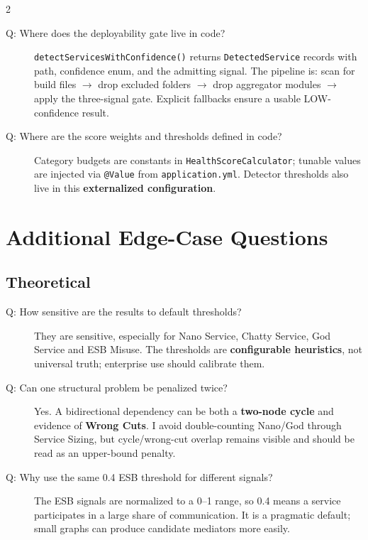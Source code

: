 \documentclass[10pt,a4paper]{article}
\begin{document}
\begin{multicols}{2}
\begin{description}
    \item[Q: Where does the deployability gate live in code?]
    \texttt{detectServicesWithConfidence()} returns \texttt{DetectedService} records with path, confidence enum, and the admitting signal. The pipeline is: scan for build files \(\rightarrow\) drop excluded folders \(\rightarrow\) drop aggregator modules \(\rightarrow\) apply the three-signal gate. Explicit fallbacks ensure a usable LOW-confidence result.

    \item[Q: Where are the score weights and thresholds defined in code?]
    Category budgets are constants in \texttt{HealthScoreCalculator}; tunable values are injected via \texttt{@Value} from \texttt{application.yml}. Detector thresholds also live in this \textbf{externalized configuration}.

\end{description}

\section{Additional Edge-Case Questions}

\subsection{Theoretical}

\begin{description}
    \item[Q: How sensitive are the results to default thresholds?]
    They are sensitive, especially for Nano Service, Chatty Service, God Service and ESB Misuse. The thresholds are \textbf{configurable heuristics}, not universal truth; enterprise use should calibrate them.

    \item[Q: Can one structural problem be penalized twice?]
    Yes. A bidirectional dependency can be both a \textbf{two-node cycle} and evidence of \textbf{Wrong Cuts}. I avoid double-counting Nano/God through Service Sizing, but cycle/wrong-cut overlap remains visible and should be read as an upper-bound penalty.

    \item[Q: Why use the same 0.4 ESB threshold for different signals?]
    The ESB signals are normalized to a 0--1 range, so 0.4 means a service participates in a large share of communication. It is a pragmatic default; small graphs can produce candidate mediators more easily.


\end{description}
\end{multicols}
\end{document}
